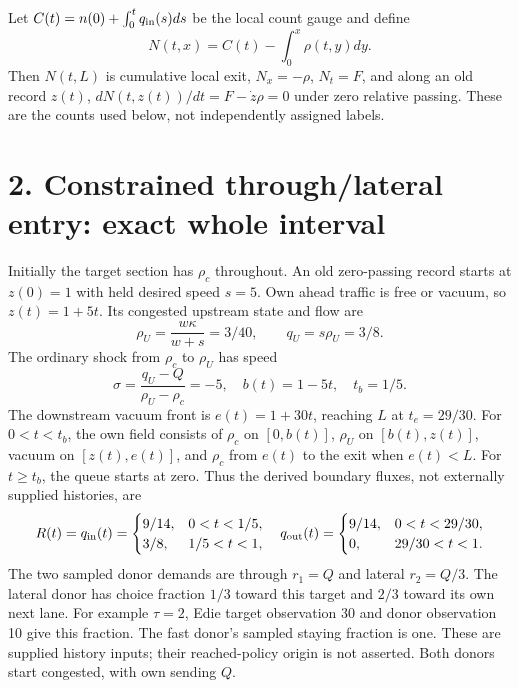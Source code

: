 \documentclass[11pt,a4paper]{article}
\begin{document}
Let $C(t)=n(0)+\int_0^t q_{\rm in}(s)ds$ be the local count gauge and define
\begin{equation}
 N(t,x)=C(t)-\int_0^x\rho(t,y)dy.
\end{equation}
Then $N(t,L)$ is cumulative local exit, $N_x=-\rho$, $N_t=F$, and along
an old record $z(t)$, $dN(t,z(t))/dt=F-\dot z\rho=0$ under zero relative
passing. These are the counts used below, not independently assigned labels.

\newpage
\section*{2. Constrained through/lateral entry: exact whole interval}
Initially the target section has $\rho_c$ throughout. An old zero-passing
record starts at $z(0)=1$ with held desired speed $s=5$. Own ahead traffic
is free or vacuum, so $z(t)=1+5t$. Its congested upstream state and flow are
\begin{equation}
 \rho_U=\frac{w\kappa}{w+s}=3/40,\qquad q_U=s\rho_U=3/8.
\end{equation}
The ordinary shock from $\rho_c$ to $\rho_U$ has speed
\begin{equation}
 \sigma=\frac{q_U-Q}{\rho_U-\rho_c}=-5,\quad
 b(t)=1-5t,\quad t_b=1/5.
\end{equation}
The downstream vacuum front is $e(t)=1+30t$, reaching $L$ at $t_e=29/30$.
For $0<t<t_b$, the own field consists of $\rho_c$ on $[0,b(t)]$,
$\rho_U$ on $[b(t),z(t)]$, vacuum on $[z(t),e(t)]$, and $\rho_c$ from
$e(t)$ to the exit when $e(t)<L$. For $t\ge t_b$, the queue starts at zero.
Thus the derived boundary fluxes, not externally supplied histories, are
\begin{equation}
 R(t)=q_{\rm in}(t)=
 \begin{cases}9/14,&0<t<1/5,\\3/8,&1/5<t<1,\end{cases}
 \quad
 q_{\rm out}(t)=\begin{cases}9/14,&0<t<29/30,\\0,&29/30<t<1.\end{cases}
\end{equation}
The two sampled donor demands are through $r_1=Q$ and lateral $r_2=Q/3$.
The lateral donor has choice fraction $1/3$ toward this target and $2/3$
toward its own next lane. For example $\tau=2$, Edie target observation 30
and donor observation 10 give this fraction. The fast donor's sampled staying
fraction is one. These are supplied history inputs; their reached-policy
origin is not asserted. Both donors start congested, with own sending $Q$.
\end{document}
